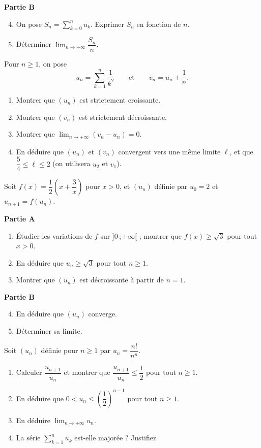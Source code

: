 \textbf{Partie B}
\begin{enumerate}
	\setcounter{enumi}{3}
	\item On pose $S_n=\displaystyle\sum_{k=0}^{n}u_k$. Exprimer $S_n$ en
	fonction de $n$.
	\item Déterminer $\displaystyle\lim_{n\to+\infty}\dfrac{S_n}{n}$.
\end{enumerate}

Pour $n\geq 1$, on pose
\[
u_n=\sum_{k=1}^{n}\frac{1}{k^{2}}
\qquad\text{et}\qquad
v_n=u_n+\frac{1}{n}.
\]
\begin{enumerate}
	\item Montrer que $(u_n)$ est strictement croissante.
	\item Montrer que $(v_n)$ est strictement décroissante.
	\item Montrer que $\displaystyle\lim_{n\to+\infty}(v_n-u_n)=0$.
	\item En déduire que $(u_n)$ et $(v_n)$ convergent vers une même limite
	$\ell$, et que $\dfrac{5}{4}\leq\ell\leq 2$
	(on utilisera $u_2$ et $v_1$).
\end{enumerate}

Soit $f(x)=\dfrac{1}{2}\left(x+\dfrac{3}{x}\right)$ pour $x>0$, et $(u_n)$
définie par $u_0=2$ et $u_{n+1}=f(u_n)$.

\textbf{Partie A}
\begin{enumerate}
	\item Étudier les variations de $f$ sur $]0\,;+\infty[$ ; montrer que
	$f(x)\geq\sqrt{3}$ pour tout $x>0$.
	\item En déduire que $u_n\geq\sqrt{3}$ pour tout $n\geq 1$.
	\item Montrer que $(u_n)$ est décroissante à partir de $n=1$.
\end{enumerate}

\textbf{Partie B}
\begin{enumerate}
	\setcounter{enumi}{3}
	\item En déduire que $(u_n)$ converge.
	\item Déterminer sa limite.
\end{enumerate}

Soit $(u_n)$ définie pour $n\geq 1$ par $u_n=\dfrac{n!}{n^{n}}$.
\begin{enumerate}
	\item Calculer $\dfrac{u_{n+1}}{u_n}$ et montrer que
	$\dfrac{u_{n+1}}{u_n}\leq\dfrac{1}{2}$ pour tout $n\geq 1$.
	\item En déduire que $0<u_n\leq\left(\dfrac12\right)^{n-1}$ pour tout
	$n\geq 1$.
	\item En déduire $\displaystyle\lim_{n\to+\infty}u_n$.
	\item La série $\displaystyle\sum_{k=1}^{n}u_k$ est-elle majorée ?
	Justifier.
\end{enumerate}
